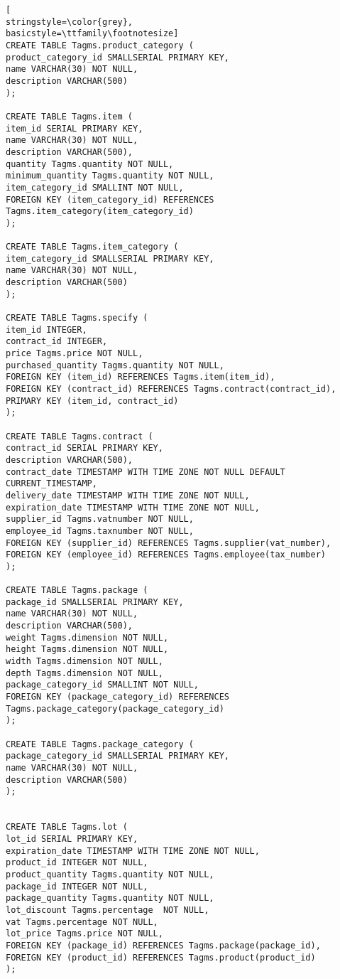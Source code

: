 \begin{lstlisting}[
stringstyle=\color{grey},
basicstyle=\ttfamily\footnotesize]
CREATE TABLE Tagms.product_category (
product_category_id SMALLSERIAL PRIMARY KEY,
name VARCHAR(30) NOT NULL,
description VARCHAR(500)
);

CREATE TABLE Tagms.item (
item_id SERIAL PRIMARY KEY,
name VARCHAR(30) NOT NULL,
description VARCHAR(500),
quantity Tagms.quantity NOT NULL,
minimum_quantity Tagms.quantity NOT NULL,
item_category_id SMALLINT NOT NULL,
FOREIGN KEY (item_category_id) REFERENCES Tagms.item_category(item_category_id)
);

CREATE TABLE Tagms.item_category (
item_category_id SMALLSERIAL PRIMARY KEY,
name VARCHAR(30) NOT NULL,
description VARCHAR(500)
);

CREATE TABLE Tagms.specify (
item_id INTEGER,
contract_id INTEGER,
price Tagms.price NOT NULL,
purchased_quantity Tagms.quantity NOT NULL,
FOREIGN KEY (item_id) REFERENCES Tagms.item(item_id),
FOREIGN KEY (contract_id) REFERENCES Tagms.contract(contract_id),
PRIMARY KEY (item_id, contract_id)
);

CREATE TABLE Tagms.contract (
contract_id SERIAL PRIMARY KEY,
description VARCHAR(500),
contract_date TIMESTAMP WITH TIME ZONE NOT NULL DEFAULT CURRENT_TIMESTAMP,
delivery_date TIMESTAMP WITH TIME ZONE NOT NULL,
expiration_date TIMESTAMP WITH TIME ZONE NOT NULL,
supplier_id Tagms.vatnumber NOT NULL,
employee_id Tagms.taxnumber NOT NULL,
FOREIGN KEY (supplier_id) REFERENCES Tagms.supplier(vat_number),
FOREIGN KEY (employee_id) REFERENCES Tagms.employee(tax_number)
);

CREATE TABLE Tagms.package (
package_id SMALLSERIAL PRIMARY KEY,
name VARCHAR(30) NOT NULL,
description VARCHAR(500),
weight Tagms.dimension NOT NULL,
height Tagms.dimension NOT NULL,
width Tagms.dimension NOT NULL,
depth Tagms.dimension NOT NULL,
package_category_id SMALLINT NOT NULL,
FOREIGN KEY (package_category_id) REFERENCES Tagms.package_category(package_category_id)
);

CREATE TABLE Tagms.package_category (
package_category_id SMALLSERIAL PRIMARY KEY,
name VARCHAR(30) NOT NULL,
description VARCHAR(500)
);


CREATE TABLE Tagms.lot (
lot_id SERIAL PRIMARY KEY,
expiration_date TIMESTAMP WITH TIME ZONE NOT NULL,
product_id INTEGER NOT NULL,
product_quantity Tagms.quantity NOT NULL,
package_id INTEGER NOT NULL,
package_quantity Tagms.quantity NOT NULL,
lot_discount Tagms.percentage  NOT NULL,
vat Tagms.percentage NOT NULL,
lot_price Tagms.price NOT NULL,
FOREIGN KEY (package_id) REFERENCES Tagms.package(package_id),
FOREIGN KEY (product_id) REFERENCES Tagms.product(product_id)
);


\end{lstlisting}
